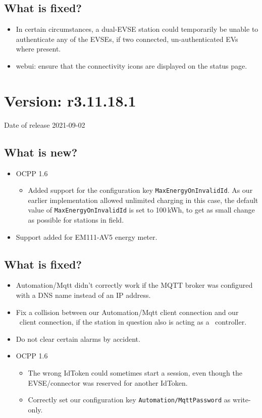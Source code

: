 \documentclass{scrartcl}
\begin{document}
\subsection*{What is fixed?}
\begin{itemize}
\item In certain circumstances, a dual-EVSE station could temporarily be
  unable to authenticate any of the EVSEs, if two connected, un-authenticated
  EVs where present.
\item webui: ensure that the connectivity icons are displayed on the status page.
\end{itemize}

\section{Version: r3.11.18.1}
Date of release 2021-09-02
\subsection*{What is new?}
\begin{itemize}
\item OCPP 1.6
  \begin{itemize}
  \item Added support for the configuration key
    \verb|MaxEnergyOnInvalidId|. As our earlier implementation allowed
    unlimited charging in this case, the default value of
    \verb|MaxEnergyOnInvalidId| is set to 100\,kWh, to get as small change as
    possible for stations in field.
  \end{itemize}
\item Support added for EM111-AV5 energy meter.
\end{itemize}
\subsection*{What is fixed?}
\begin{itemize}
\item Automation/Mqtt didn't correctly work if the MQTT broker was configured
  with a DNS name instead of an IP address.
\item Fix a collision between our Automation/Mqtt client connection and our
  \nanogrid\ client connection, if the station in question also is acting as a
  \nanogrid\ controller.
\item Do not clear certain alarms by accident.
\item OCPP 1.6
  \begin{itemize}
  \item The wrong IdToken could sometimes start a session, even though the
    EVSE/connector was reserved for another IdToken.
  \item Correctly set our configuration key \verb|Automation/MqttPassword| as
    write-only.
  \end{itemize}
\end{itemize}
\end{document}
